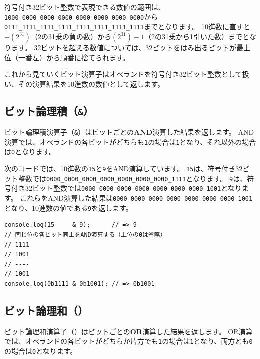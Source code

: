 符号付き32ビット整数で表現できる数値の範囲は、\texttt{1000\_0000\_0000\_0000\_0000\_0000\_0000\_0000}から
\texttt{0111\_1111\_1111\_1111\_1111\_1111\_1111\_1111}までとなります。
10進数に直すと$-(2^{31})$（2の31乗の負の数）から$(2^{31}) - 1$（2の31乗から1引いた数）までとなります。
32ビットを超える数値については、32ビットをはみ出るビットが最上位（一番左）から順番に捨てられます。

これから見ていくビット演算子はオペランドを符号付き32ビット整数として扱い、その演算結果を10進数の数値として返します。

\hypertarget{bit-and}{%
\subsection{\texorpdfstring{ビット論理積（\texttt{\&}）}{ビット論理積（\&）}}\label{bit-and}}

ビット論理積演算子（\texttt{\&}）はビットごとの\textbf{AND}演算した結果を返します。
AND演算では、オペランドの各ビットがどちらも\texttt{1}の場合は\texttt{1}となり、それ以外の場合は\texttt{0}となります。

次のコードでは、10進数の\texttt{15}と\texttt{9}をAND演算しています。
\texttt{15}は、符号付き32ビット整数では\texttt{0000\_0000\_0000\_0000\_0000\_0000\_0000\_1111}となります。
\texttt{9}は、符号付き32ビット整数では\texttt{0000\_0000\_0000\_0000\_0000\_0000\_0000\_1001}となります。
これらをAND演算した結果は\texttt{0000\_0000\_0000\_0000\_0000\_0000\_0000\_1001}となり、10進数の値である\texttt{9}を返します。

\begin{lstlisting}
console.log(15     & 9);      // => 9
// 同じ位の各ビット同士をAND演算する（上位の0は省略）
// 1111
// 1001
// ----
// 1001
console.log(0b1111 & 0b1001); // => 0b1001
\end{lstlisting}

\hypertarget{bit-or}{%
\subsection{\texorpdfstring{ビット論理和（\texttt{\textbar{}}）}{ビット論理和（\textbar{}）}}\label{bit-or}}

ビット論理和演算子（\texttt{\textbar{}}）はビットごとの\textbf{OR}演算した結果を返します。
OR演算では、オペランドの各ビットがどちらか片方でも\texttt{1}の場合は\texttt{1}となり、両方とも\texttt{0}の場合は\texttt{0}となります。

